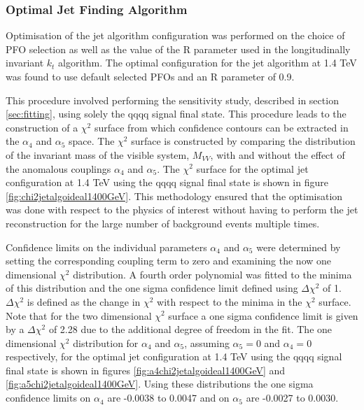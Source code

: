 
\subsubsection{Optimal Jet Finding Algorithm}
\label{sec:optimaljetalgorithm}
Optimisation of the jet algorithm configuration was performed on the choice of PFO selection as well as the value of the R parameter used in the longitudinally invariant $k_{t}$ algorithm.   The optimal configuration for the jet algorithm at 1.4 TeV was found to use default selected PFOs and an R parameter of 0.9.

This procedure involved performing the sensitivity study, described in section \ref{sec:fitting}, using solely the {\nu}{\nu}qqqq signal final state.  This procedure leads to the construction of a $\chi^{2}$ surface from which confidence contours can be extracted in the $\alpha_{4}$ and $\alpha_{5}$ space.  The $\chi^{2}$ surface is constructed by comparing the distribution of the invariant mass of the visible system, $M_{VV}$, with and without the effect of the anomalous couplings $\alpha_{4}$ and $\alpha_{5}$.  The $\chi^{2}$ surface for the optimal jet configuration at 1.4 TeV using the {\nu}{\nu}qqqq signal final state is shown in figure \ref{fig:chi2jetalgoideal1400GeV}.  This methodology ensured that the optimisation was done with respect to the physics of interest without having to perform the jet reconstruction for the large number of background events multiple times.  

Confidence limits on the individual parameters $\alpha_{4}$ and $\alpha_{5}$ were determined by setting the corresponding coupling term to zero and examining the now one dimensional $\chi^{2}$ distribution.  A fourth order polynomial was fitted to the minima of this distribution and the one sigma confidence limit defined using $\Delta\chi^{2}$ of 1.  $\Delta\chi^{2}$ is defined as the change in $\chi^{2}$ with respect to the minima in the $\chi^{2}$ surface.  Note that for the two dimensional $\chi^{2}$ surface a one sigma confidence limit is given by a $\Delta\chi^{2}$ of 2.28 due to the additional degree of freedom in the fit.  The one dimensional $\chi^{2}$ distribution for $\alpha_{4}$ and $\alpha_{5}$, assuming $\alpha_{5} = 0$ and $\alpha_{4} = 0$ respectively, for the optimal jet configuration at 1.4 TeV using the {\nu}{\nu}qqqq signal final state is shown in figures \ref{fig:a4chi2jetalgoideal1400GeV} and \ref{fig:a5chi2jetalgoideal1400GeV}.  Using these distributions the one sigma confidence limits on $\alpha_{4}$ are -0.0038 to 0.0047 and on $\alpha_{5}$ are -0.0027 to 0.0030.


